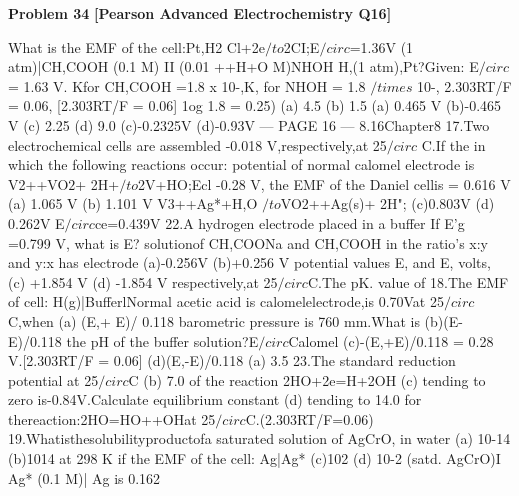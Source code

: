 \begin{problembox}
\textbf{Problem 34} \hfill \textbf{[Pearson Advanced Electrochemistry Q16]}
\label{q:ext-pearson-34}

What is the EMF of the cell:Pt,H2
Cl+2e$/to$2CI;E$/circ$=1.36V
(1 atm)|CH,COOH (0.1 M) II (0.01
++H+O
M)NHOH H,(1 atm),Pt?Given:
E$/circ$= 1.63 V.
Kfor CH,COOH =1.8 x 10-,K, for
NHOH = 1.8 $/times$ 10-, 2.303RT/F = 0.06,
[2.303RT/F = 0.06]
1og 1.8 = 0.25)
(a) 4.5
(b) 1.5
(a) 0.465 V
(b)-0.465 V
(c) 2.25
(d) 9.0
(c)-0.2325V
(d)-0.93V
--- PAGE 16 ---
8.16Chapter8
17.Two electrochemical cells are assembled
-0.018 V,respectively,at 25$/circ$ C.If the
in which the following reactions occur:
potential of normal calomel electrode is
V2++VO$2$+ 2H+$/to$2V+HO;Ecl
-0.28 V, the EMF of the Daniel cellis
= 0.616 V
(a) 1.065 V
(b) 1.101 V
V3++Ag*+H,O $/to$VO$2$++Ag(s)+ 2H";
(c)0.803V
(d) 0.262V
E$/circ$ce=0.439V
22.A hydrogen electrode placed in a buffer
If E'g =0.799 V, what is E?
solutionof CH,COONa and CH,COOH
in the ratio's x:y and y:x has electrode
(a)-0.256V
(b)+0.256 V
potential values E, and E, volts,
(c) +1.854 V
(d) -1.854 V
respectively,at 25$/circ$C.The pK. value of
18.The EMF of cell: H(g)|BufferlNormal
acetic acid is
calomelelectrode,is 0.70Vat 25$/circ$C,when
(a) (E,+ E)/ 0.118
barometric pressure is 760 mm.What is
(b)(E-E)/0.118
the pH of the buffer solution?E$/circ$Calomel
(c)-(E,+E)/0.118
= 0.28 V.[2.303RT/F = 0.06]
(d)(E,-E)/0.118
(a) 3.5
23.The standard reduction potential at 25$/circ$C
(b) 7.0
of the reaction 2HO+2e=H+2OH
(c) tending to zero
is-0.84V.Calculate equilibrium constant
(d) tending to 14.0
for thereaction:2HO=HO++OHat
25$/circ$C.(2.303RT/F=0.06)
19.Whatisthesolubilityproductofa
saturated solution of AgCrO, in water
(a) 10-14
(b)1014
at 298 K if the EMF of the cell: Ag|Ag*
(c)102
(d) 10-2
(satd. AgCrO)I Ag* (0.1 M)| Ag is 0.162
\end{problembox}

